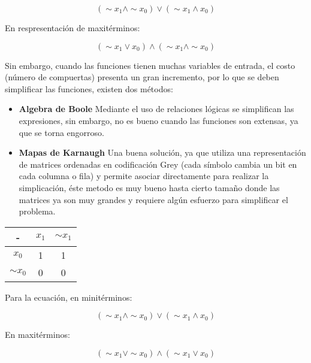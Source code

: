 \documentclass[letter]{article}
\begin{document}
\begin{equation}
	(\sim{x_1} \wedge \sim{x_0}) \vee (\sim{x_1} \wedge x_0)
\end{equation}

En respresentación de maxitérminos:

\begin{equation}
	(\sim{x_1} \vee x_0) \wedge (\sim{x_1} \wedge \sim{x_0})
\end{equation}

Sin embargo, cuando las funciones tienen muchas variables de entrada, el costo (número de compuertas) presenta un gran incremento, por lo que se deben simplificar las funciones, existen dos métodos:

\begin{itemize}
	\item \textbf{Algebra de Boole} Mediante el uso de relaciones lógicas se simplifican las expresiones, sin embargo, no es bueno cuando las funciones son extensas, ya que se torna engorroso.
	\item \textbf{Mapas de Karnaugh} Una buena solución, ya que utiliza una representación de matrices ordenadas en codificación Grey (cada símbolo cambia un bit en cada columna o fila) y permite asociar directamente para realizar la simplicación, éste metodo es muy bueno hasta cierto tamaño donde las matrices ya son muy grandes y requiere algún esfuerzo para simplificar el problema.
\end{itemize}

\begin{table}[H]
	\centering
	\begin{tabular}{|c | c | c|}
		\hline
		- &$x_1$ & $\sim{x_1}$\\
		\hline
		$x_0$ & 1 & 1\\
		\hline
		$\sim{x_0}$ & 0& 0\\
		\hline
	\end{tabular}
\end{table}

Para la ecuación, en minitérminos:

\begin{equation}
	(\sim{x_1} \wedge \sim{x_0}) \vee (\sim{x_1} \wedge x_0)
\end{equation}

En maxitérminos:

\begin{equation}
	(\sim{x_1} \vee \sim{x_0}) \wedge (\sim{x_1} \vee x_0)
\end{equation}
\end{document}
